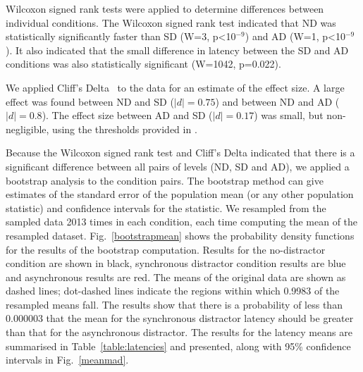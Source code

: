 \documentclass[10pt,letterpaper]{article}
\begin{document}
Wilcoxon signed rank tests were applied to determine differences
between individual conditions. The Wilcoxon signed rank test indicated
that ND was statistically significantly faster than SD (W=3,
p\textless10$^{-9}$) and AD (W=1, p\textless10$^{-9}$). It also indicated
that the small difference in latency between the SD and AD conditions
was also statistically significant (W=1042, p=0.022).

We applied Cliff's Delta~\cite{cliff_ordinal_2014} to the data for
an estimate of the effect size. A large effect was found between ND
and SD ($|d|=0.75$) and between ND and AD ($|d|=0.8$). The effect size
between AD and SD ($|d|=0.17$) was small, but non-negligible, using
the thresholds provided in \cite{romano_appropriate_2006}.

Because the Wilcoxon signed rank test and Cliff's Delta indicated that
there is a significant difference between all pairs of levels (ND, SD
and AD), we applied a bootstrap analysis to the condition pairs.  The
bootstrap method can give estimates of the standard error of the
population mean (or any other population statistic) and confidence
intervals for the statistic. We resampled from the sampled data 2013
times in each condition, each time computing the mean of the resampled
dataset. Fig.~\ref{bootstrapmean} shows the probability density
functions for the results of the bootstrap computation. Results for
the no-distractor condition are shown in black, synchronous distractor
condition results are blue and asynchronous results are red. The means
of the original data are shown as dashed lines; dot-dashed lines
indicate the regions within which 0.9983 of the resampled means
fall. The results show that there is a probability of less than
0.000003 that the mean for the synchronous distractor latency should
be greater than that for the asynchronous distractor. The results for
the latency means are summarised in Table~\ref{table:latencies} and
presented, along with 95\% confidence intervals in Fig.~\ref{meanmad}.
\end{document}
